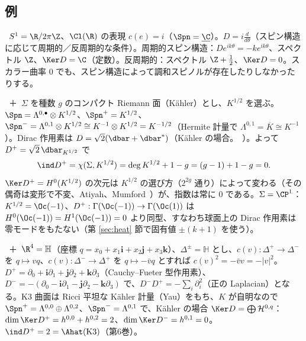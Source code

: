 \subsection{例}
\begin{ex}[1 次元：円周]\label{ex:DiracS1}\tP\
$S^1=\R/2\pi\Z$、$\Cl(\R)$ の表現 $c(e)=i$（$\Spn=\underline\C$）。$D=i\frac d{d\theta}$（スピン構造に応じて周期的／反周期的な条件）。周期的スピン構造：$De^{ik\theta}=-ke^{ik\theta}$、スペクトル $\Z$、$\Ker D=\C$（定数）。反周期的：スペクトル $\Z+\frac12$、$\Ker D=0$。スカラー曲率 $0$ でも、スピン構造によって調和スピノルが存在したりしなかったりする。
\end{ex}
\begin{ex}[2 次元：Riemann 面]\label{ex:Dirac2d}\tC\ ＋\tP\
$\Sigma$ を種数 $g$ のコンパクト Riemann 面（Kähler）とし、$K^{1/2}$ を選ぶ。$\Spn=\Lambda^{0,\bullet}\otimes K^{1/2}$、$\Spn^+=K^{1/2}$、$\Spn^-=\Lambda^{0,1}\otimes K^{1/2}\cong K^{-1}\otimes K^{1/2}=K^{-1/2}$（Hermite 計量で $\Lambda^{0,1}=\overline K\cong K^{-1}$）。Dirac 作用素は $D=\sqrt2(\dbar+\dbar^*)$（Kähler の場合。\tC\ ）。よって $D^+=\sqrt2\,\dbar_{K^{1/2}}$ で
\[
\ind D^+=\chi(\Sigma,K^{1/2})=\deg K^{1/2}+1-g=(g-1)+1-g=0.
\]
$\Ker D^+=H^0(K^{1/2})$ の次元は $K^{1/2}$ の選び方（$2^{2g}$ 通り）によって変わる（その偶奇は変形で不変、Atiyah、Mumford\tQ\ ）が、指数は常に $0$ である。$\Sigma=\CP^1$：$K^{1/2}=\Oc(-1)$、$D^+:\Gamma(\Oc(-1))\to\Gamma(\Oc(1))$ は $H^0(\Oc(-1))=H^1(\Oc(-1))=0$ より同型、すなわち球面上の Dirac 作用素は零モードをもたない（第 \ref{sec:heat} 節で固有値 $\pm(k+1)$ を使う）。
\end{ex}
\begin{ex}[4 次元：$\R^4=\mathbb H$ と K3]\label{ex:Dirac4d}\tC\ ＋\tP\
$\R^4=\mathbb H$（座標 $q=x_0+x_1\mathbf i+x_2\mathbf j+x_3\mathbf k$）、$\Delta^\pm=\mathbb H$ とし、$c(v):\Delta^+\to\Delta^-$ を $q\mapsto vq$、$c(v):\Delta^-\to\Delta^+$ を $q\mapsto-\bar vq$ とすれば $c(v)^2=-\bar vv=-|v|^2$。$D^+=\partial_0+\mathbf i\partial_1+\mathbf j\partial_2+\mathbf k\partial_3$（Cauchy--Fueter 型作用素）、$D^-=-(\partial_0-\mathbf i\partial_1-\mathbf j\partial_2-\mathbf k\partial_3)$ で、$D^-D^+=-\sum_i\partial_i^2$（正の Laplacian）となる。K3 曲面は Ricci 平坦な Kähler 計量（Yau）をもち、$K$ が自明なので $\Spn^+=\Lambda^{0,0}\oplus\Lambda^{0,2}$、$\Spn^-=\Lambda^{0,1}$ で、Kähler の場合 $\Ker D=\bigoplus\mathcal H^{0,q}$：$\dim\Ker D^+=h^{0,0}+h^{0,2}=2$、$\dim\Ker D^-=h^{0,1}=0$。$\ind D^+=2=\Ahat(\text{K3})$（第6巻）。
\end{ex}

